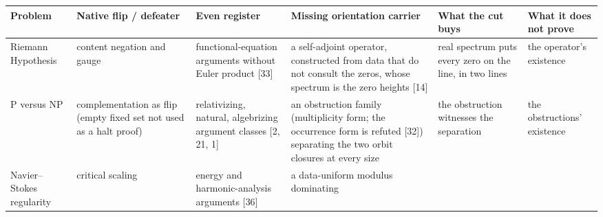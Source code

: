 \documentclass[10pt,twocolumn]{article}
\begin{document}
\begin{table}[!tbp]
\smaller
\centering
\begin{tabular}{@{}
  >{\raggedright\arraybackslash}p{}
  >{\raggedright\arraybackslash}p{}
  >{\raggedright\arraybackslash}p{}
  >{\raggedright\arraybackslash}p{}
  >{\raggedright\arraybackslash}p{}
  >{\raggedright\arraybackslash}p{}@{}}

\toprule\noalign{}
\begin{minipage}[b]{\linewidth}\raggedright
Problem
\end{minipage} & \begin{minipage}[b]{\linewidth}\raggedright
Native flip / defeater
\end{minipage} & \begin{minipage}[b]{\linewidth}\raggedright
Even register
\end{minipage} & \begin{minipage}[b]{\linewidth}\raggedright
Missing orientation carrier
\end{minipage} & \begin{minipage}[b]{\linewidth}\raggedright
What the cut buys
\end{minipage} & \begin{minipage}[b]{\linewidth}\raggedright
What it does not prove
\end{minipage} \\
\midrule\noalign{}
\bottomrule\noalign{}
Riemann Hypothesis & content negation and gauge & functional-equation
arguments without Euler product {[}33{]} & a self-adjoint operator,
constructed from data that do not consult the zeros, whose spectrum is
the zero heights {[}14{]} & real spectrum puts every zero on the line,
in two lines & the operator's existence \\
P versus NP & complementation as flip (empty fixed set not used as a
halt proof) & relativizing, natural, algebrizing argument classes {[}2,
21, 1{]} & an obstruction family (multiplicity form; the occurrence form
is refuted {[}32{]}) separating the two orbit closures at every size &
the obstruction witnesses the separation & the obstructions'
existence \\
Navier--Stokes regularity & critical scaling & energy and
harmonic-analysis arguments {[}36{]} & a data-uniform modulus dominating

\end{tabular}
\end{table}
\end{document}

